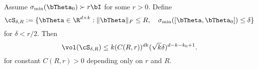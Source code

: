 %
\begin{lemma}\label{lemma:VolumeBound}
Assume $\sigma_{\min}(\bTheta_0) \succ r\bI$ for some $r>0$.
Define
   \begin{equation}
       \cS_{\delta,R} := \{ \bTheta \in\R^{d\times k} : \|\bTheta\|_F \le R,\quad \sigma_{\min}([\bTheta,\bTheta_0]) \le \delta \}
   \end{equation}
   for $\delta < r/2$.
Then 
%
\begin{equation}
    \vol(\cS_{\delta,R}) \le
     k (C(R,r))^{dk} (\sqrt{k} \delta)^{d - k - k_0+1}.
\end{equation}
for constant $C(R,r)>0$ depending only on $r$ and $R.$
\end{lemma}
